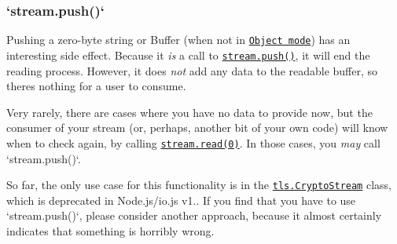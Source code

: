 \subsubsection*{`stream.push(\textquotesingle{}\textquotesingle{})`}

Pushing a zero-\/byte string or Buffer (when not in \href{#stream_object_mode}{\tt Object mode}) has an interesting side effect. Because it {\itshape is} a call to \href{#stream_readable_push_chunk_encoding}{\tt {\ttfamily stream.\+push()}}, it will end the {\ttfamily reading} process. However, it does {\itshape not} add any data to the readable buffer, so there\textquotesingle{}s nothing for a user to consume.

Very rarely, there are cases where you have no data to provide now, but the consumer of your stream (or, perhaps, another bit of your own code) will know when to check again, by calling \href{#stream_readable_read_size}{\tt {\ttfamily stream.\+read(0)}}. In those cases, you {\itshape may} call `stream.push(\textquotesingle{}\textquotesingle{})`.

So far, the only use case for this functionality is in the \href{https://nodejs.org/docs/v5.8.0/api/tls.html#tls_class_cryptostream}{\tt {\ttfamily tls.\+Crypto\+Stream}} class, which is deprecated in Node.\+js/io.js v1.. If you find that you have to use `stream.push(\textquotesingle{}\textquotesingle{})`, please consider another approach, because it almost certainly indicates that something is horribly wrong. 